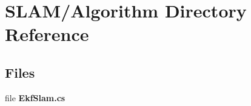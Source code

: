 \section{S\-L\-A\-M/\-Algorithm Directory Reference}
\label{dir_1e9c4242ac904a063bb8f076f4a63726}
\subsection*{Files}
\begin{DoxyCompactItemize}
\item 
file {\bf Ekf\-Slam.\-cs}
\end{DoxyCompactItemize}

